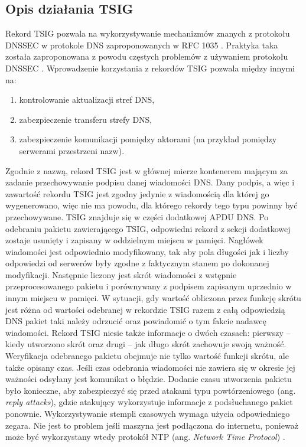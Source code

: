 \subsection{Opis działania TSIG}
\label{tsig}
Rekord TSIG pozwala na wykorzystywanie mechanizmów znanych z protokołu DNSSEC \cite{nask-tsig} w protokole DNS zaproponowanych w
RFC 1035 \cite{RFC1035}. Praktyka taka została zaproponowana z powodu częstych problemów z używaniem protokołu
DNSSEC \cite{RFC4033, RFC4035}. Wprowadzenie korzystania z rekordów TSIG pozwala między innymi na:
\begin{enumerate}
	\item kontrolowanie aktualizacji stref DNS,
	\item zabezpieczenie transferu strefy DNS,
	\item zabezpieczenie komunikacji pomiędzy aktorami (na przykład pomiędzy serwerami przestrzeni nazw).
\end{enumerate}

Zgodnie z nazwą, rekord TSIG jest w głównej mierze kontenerem mającym za zadanie przechowywanie podpisu danej wiadomości DNS.
Dany podpis, a więc i zawartość rekordu TSIG jest zgodny jedynie z wiadomością dla której go wygenerowano, więc
nie ma powodu, dla którego rekordy tego typu powinny być przechowywane.
TSIG znajduje się w części dodatkowej APDU DNS. Po odebraniu pakietu zawierającego TSIG, odpowiedni rekord z sekcji dodatkowej zostaje
usunięty i zapisany w oddzielnym miejscu w pamięci. Nagłówek wiadomości jest odpowiednio modyfikowany, tak aby pola długości jak i
liczby odpowiedzi od serwerów były zgodne z faktycznym stanem po dokonanej modyfikacji. Następnie liczony jest skrót wiadomości z
wstępnie przeprocesowanego pakietu i porównywany z podpisem zapisanym uprzednio w innym miejscu w pamięci. W sytuacji, gdy wartość
obliczona przez funkcję skrótu jest różna od wartości odebranej w rekordzie TSIG razem z całą odpowiedzią DNS pakiet taki należy
odrzucić oraz powiadomić o tym fakcie nadawcę wiadomości. Rekord TSIG niesie także informacje o dwóch czasach: pierwszy -- kiedy
utworzono skrót oraz drugi -- jak długo skrót zachowuje swoją ważność. Weryfikacja odebranego pakietu obejmuje nie tylko wartość
funkcji skrótu, ale także opisany czas. Jeśli czas odebrania wiadomości nie zawiera się w okresie jej ważności odsyłany jest komunikat
o błędzie. Dodanie czasu utworzenia pakietu było konieczne, aby zabezpieczyć się przed atakami typu powtórzeniowego (ang. \textit{reply attacks}),
gdzie atakujący wykorzystuje informacje z podsłuchanego pakiet ponownie. Wykorzystywanie stempli czasowych wymaga użycia
odpowiedniego zegara. Nie jest to problem jeśli maszyna jest podłączona do internetu, ponieważ może
być wykorzystany wtedy protokół NTP (ang. \textit{Network Time Protocol}) \cite{RFC5905}.

